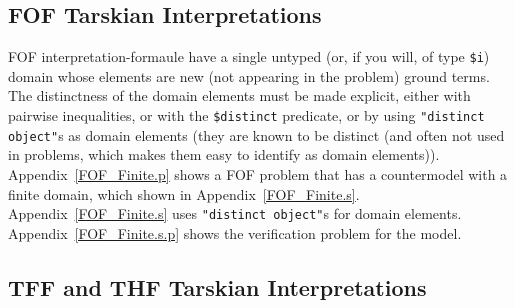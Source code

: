 \documentclass{easychair}
\begin{document}
\subsection{FOF Tarskian Interpretations}
\label{NewTarskianFOF}

FOF interpretation-formaule have a single untyped (or, if you will, of type {\tt \$i}) domain whose
elements are new (not appearing in the problem) ground terms. 
The distinctness of the domain elements must be made explicit, either with pairwise inequalities, 
or with the {\tt \$distinct} predicate, or by using {\tt "distinct object"}s as domain elements 
(they are known to be distinct (and often not used in problems, which makes them easy 
to identify as domain elements)).
Appendix~\ref{FOF_Finite.p} shows a FOF problem that has a countermodel with a finite domain, 
which shown in Appendix~\ref{FOF_Finite.s}.
Appendix~\ref{FOF_Finite.s} uses {\tt "distinct object"}s for domain elements.
Appendix~\ref{FOF_Finite.s.p} shows the verification problem for the model.

\subsection{TFF and THF Tarskian Interpretations}
\label{NewTarskianTFFTHF}
\end{document}
